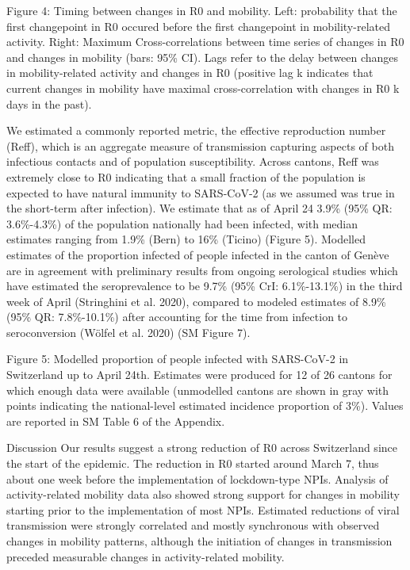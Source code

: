 Figure 4: Timing between changes in R0 and mobility. Left: probability that the first changepoint in R0 occured before the first changepoint in mobility-related activity. Right: Maximum Cross-correlations between time series of changes in R0 and changes in mobility (bars: 95\% CI). Lags refer to the delay between changes in mobility-related activity and changes in R0 (positive lag k indicates that current changes in mobility have maximal cross-correlation with changes in R0 k days in the past).



We estimated a commonly reported metric, the effective reproduction number (Reff), which is an aggregate measure of transmission capturing aspects of both infectious contacts and of population susceptibility. Across cantons, Reff was extremely close to R0 indicating that a small fraction of the population is expected to have natural immunity to SARS-CoV-2 (as we assumed was true in the short-term after infection). We estimate that as of April 24 3.9\% (95\% QR: 3.6\%-4.3\%) of the population nationally had been infected, with median estimates ranging from 1.9\% (Bern) to 16\% (Ticino) (Figure 5). Modelled estimates of the proportion infected of people infected in the canton of Genève are in agreement with preliminary results from ongoing serological studies which have estimated the seroprevalence to be 9.7\% (95\% CrI: 6.1\%-13.1\%) in the third week of April (Stringhini et al. 2020), compared to modeled estimates of 8.9\% (95\% QR: 7.8\%-10.1\%) after accounting for the time from infection to seroconversion (Wölfel et al. 2020) (SM Figure 7). 

Figure 5: Modelled proportion of people infected with SARS-CoV-2 in Switzerland up to April 24th. Estimates were produced for 12 of 26 cantons for which enough data were available (unmodelled cantons are shown in gray with points indicating the national-level estimated incidence proportion of 3\%). Values are reported in SM Table 6 of the Appendix. 

Discussion
Our results suggest a strong reduction of R0 across Switzerland since the start of the epidemic. The reduction in R0 started around March 7, thus about one week before the implementation of lockdown-type NPIs. Analysis of activity-related mobility data also showed strong support for changes in mobility starting prior to the implementation of most NPIs. Estimated  reductions of viral transmission were strongly correlated and mostly synchronous with observed changes in mobility patterns, although the initiation of changes in transmission preceded measurable changes in activity-related mobility. 

